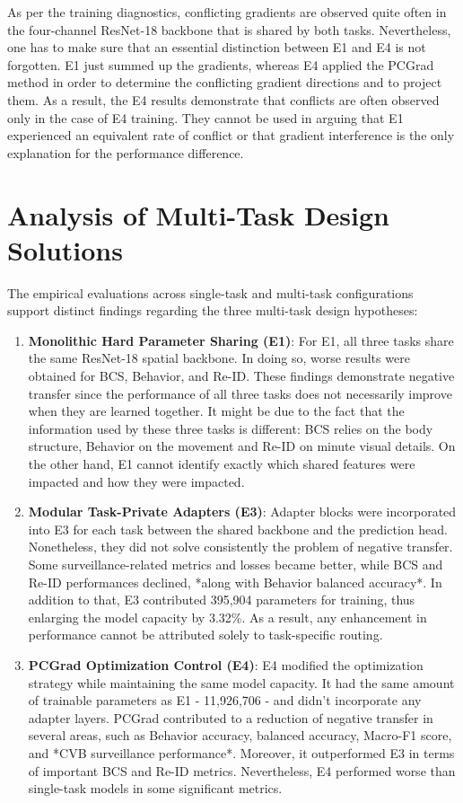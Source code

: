 

As per the training diagnostics, conflicting gradients are observed quite often in the four-channel ResNet-18 backbone that is shared by both tasks. Nevertheless, one has to make sure that an essential distinction between E1 and E4 is not forgotten. E1 just summed up the gradients, whereas E4 applied the PCGrad method in order to determine the conflicting gradient directions and to project them. As a result, the E4 results demonstrate that conflicts are often observed only in the case of E4 training. They cannot be used in arguing that E1 experienced an equivalent rate of conflict or that gradient interference is the only explanation for the performance difference.

\section{Analysis of Multi-Task Design Solutions}

The empirical evaluations across single-task and multi-task configurations support distinct findings regarding the three multi-task design hypotheses:
\begin{enumerate}
 \item \textbf{Monolithic Hard Parameter Sharing (E1)}: For E1, all three tasks share the same ResNet-18 spatial backbone. In doing so, worse results were obtained for BCS, Behavior, and Re-ID. These findings demonstrate negative transfer since the performance of all three tasks does not necessarily improve when they are learned together. It might be due to the fact that the information used by these three tasks is different: BCS relies on the body structure, Behavior on the movement and Re-ID on minute visual details. On the other hand, E1 cannot identify exactly which shared features were impacted and how they were impacted.
 \item \textbf{Modular Task-Private Adapters (E3)}: Adapter blocks were incorporated into E3 for each task between the shared backbone and the prediction head. Nonetheless, they did not solve consistently the problem of negative transfer. Some surveillance-related metrics and losses became better, while BCS and Re-ID performances declined, *along with Behavior balanced accuracy*. In addition to that, E3 contributed 395,904 parameters for training, thus enlarging the model capacity by 3.32\%. As a result, any enhancement in performance cannot be attributed solely to task-specific routing.
 \item \textbf{PCGrad Optimization Control (E4)}: E4 modified the optimization strategy while maintaining the same model capacity. It had the same amount of trainable parameters as E1 - 11,926,706 - and didn't incorporate any adapter layers. PCGrad contributed to a reduction of negative transfer in several areas, such as Behavior accuracy, balanced accuracy, Macro-F1 score, and *CVB surveillance performance*. Moreover, it outperformed E3 in terms of important BCS and Re-ID metrics. Nevertheless, E4 performed worse than single-task models in some significant metrics.
\end{enumerate}

